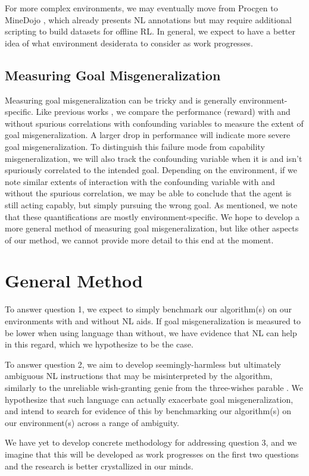 \documentclass[../main.tex]{subfiles}
\begin{document}
For more complex environments, we may eventually move from Procgen to MineDojo
\citep{fan_minedojo_2022}, which already presents NL annotations but may require additional
scripting to build datasets for offline RL. In general, we expect to have a better idea of what
environment desiderata to consider as work progresses.

\subsection{Measuring Goal Misgeneralization}

Measuring goal misgeneralization can be tricky and is generally environment-specific. Like previous
works \citep{langosco_goal_2022, shah_benefits_2021, de_haan_causal_2019}, we compare the
performance (reward) with and without spurious correlations with confounding variables to measure
the extent of goal misgeneralization. A larger drop in performance will indicate more severe goal
misgeneralization. To distinguish this failure mode from capability misgeneralization, we will also
track the confounding variable when it is and isn't spuriously correlated to the intended goal.
Depending on the environment, if we note similar extents of interaction with the confounding
variable with and without the spurious correlation, we may be able to conclude that the agent is
still acting capably, but simply pursuing the wrong goal. As mentioned, we note that these
quantifications are mostly environment-specific. We hope to develop a more general method of
measuring goal misgeneralization, but like other aspects of our method, we cannot provide more
detail to this end at the moment.

\section{General Method}

To answer question 1, we expect to simply benchmark our algorithm(s) on our environments with and
without NL aids. If goal misgeneralization is measured to be lower when using language
than without, we have evidence that NL can help in this regard, which we hypothesize
to be the case.

To answer question 2, we aim to develop seemingly-harmless but ultimately ambiguous NL
instructions that may be misinterpreted by the algorithm, similarly to the unreliable wish-granting
genie from the three-wishes parable \citep{perrault_les_1865, galland_les_1717}. We hypothesize that
such language can actually exacerbate goal misgeneralization, and intend to search for evidence of
this by benchmarking our algorithm(s) on our environment(s) across a range of ambiguity.

We have yet to develop concrete methodology for addressing question 3, and we imagine that this will
be developed as work progresses on the first two questions and the research is better crystallized
in our minds.


\ifSubfilesClassLoaded{%
	
}{}
\end{document}
